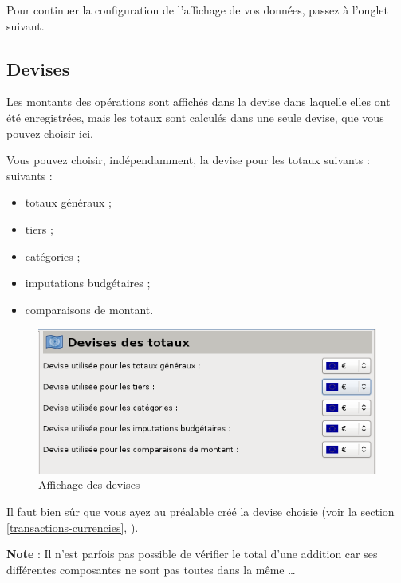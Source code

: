 Pour continuer la configuration de l'affichage de vos données, passez à l'onglet suivant.


\subsection{Devises\label{reportscreation-display-currencies}}

Les montants des opérations sont affichés dans la devise dans laquelle elles ont été enregistrées, mais les totaux sont calculés dans une seule devise, que vous pouvez choisir ici. 

Vous pouvez choisir, indépendamment, la devise pour les totaux \ifIllustration suivants :
\else suivants :
\fi

\begin{itemize}
	\item totaux généraux ;
	\item tiers ;
	\item catégories ;
	\item imputations budgétaires ;
	\item comparaisons de montant.
\end{itemize} 

\ifIllustration
\begin{figure}[htbp]
\begin{center}
\includegraphics[scale=0.5]{image/screenshot/reportcreation_display_currencies}
\end{center}
\caption{Affichage des devises}
\label{reportcreation-display-currencies-img}
\end{figure}
\fi

Il faut bien sûr que vous ayez au préalable créé la devise choisie (voir la section \vref{transactions-currencies}, ). 

\textbf{Note} : Il n'est parfois pas possible de vérifier le total d'une addition car ses différentes composantes ne sont pas toutes dans la même \dots

